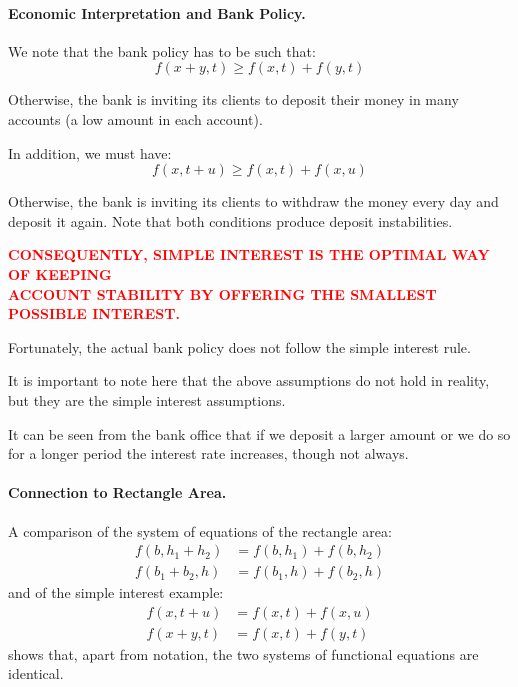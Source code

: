 \paragraph{Economic Interpretation and Bank Policy.}
We note that the bank policy has to be such that:
\begin{equation}
\boxed{f(x + y, t) \geq f(x, t) + f(y, t)}
\end{equation}

Otherwise, the bank is inviting its clients to deposit their money in many accounts (a low amount in each account).

In addition, we must have:
\begin{equation}
\boxed{f(x, t + u) \geq f(x, t) + f(x, u)}
\end{equation}

Otherwise, the bank is inviting its clients to withdraw the money every day and deposit it again. Note that both conditions produce deposit instabilities.

\vspace{3mm}
\begin{center}
   \textcolor{red}{\bf CONSEQUENTLY, SIMPLE INTEREST IS THE OPTIMAL WAY OF KEEPING\\ ACCOUNT STABILITY BY OFFERING THE SMALLEST POSSIBLE INTEREST.}

\end{center}
\vspace{3mm}

Fortunately, the actual bank policy does not follow the simple interest rule.

It is important to note here that the above assumptions do not hold in reality, but they are the simple interest assumptions.

It can be seen from the bank office that if we deposit a larger amount or we do so for a longer period the interest rate increases, though not always.

\paragraph{Connection to Rectangle Area.}
A comparison of the system of equations of the rectangle area:
\begin{align}
f(b, h_1 + h_2) &= f(b, h_1) + f(b, h_2) \\
f(b_1 + b_2, h) &= f(b_1, h) + f(b_2, h)
\end{align}
and of the simple interest example:
\begin{align}
f(x, t + u) &= f(x, t) + f(x, u) \\
f(x + y, t) &= f(x, t) + f(y, t)
\end{align}
shows that, apart from notation, the two systems of functional equations are identical.

